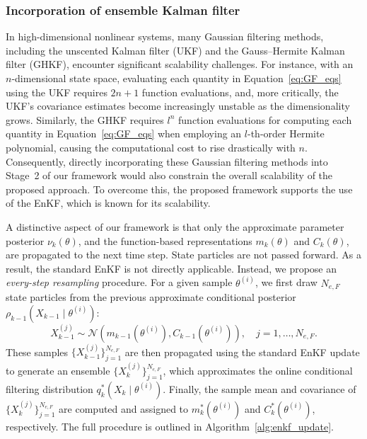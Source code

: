 \documentclass[preprint,3p,times]{elsarticle}
\begin{document}
\subsubsection{Incorporation of ensemble Kalman filter}
In high-dimensional nonlinear systems, many Gaussian filtering methods, including the unscented Kalman filter (UKF) and the Gauss–Hermite Kalman filter (GHKF), encounter significant scalability challenges. For instance, with an $n$-dimensional state space, evaluating each quantity in Equation~\eqref{eq:GF_eqs} using the UKF requires $2n+1$ function evaluations, and, more critically, the UKF’s covariance estimates become increasingly unstable as the dimensionality grows. Similarly, the GHKF requires $l^n$ function evaluations for computing each quantity in Equation~\eqref{eq:GF_eqs} when employing an $l$-th-order Hermite polynomial, causing the computational cost to rise drastically with $n$. Consequently, directly incorporating these Gaussian filtering methods into Stage~2 of our framework would also constrain the overall scalability of the proposed approach. To overcome this, the proposed framework supports the use of the EnKF, which is known for its scalability. 

A distinctive aspect of our framework is that only the approximate parameter posterior \( \nu_k(\theta) \), and the function-based representations \( m_k(\theta) \) and \( C_k(\theta) \), are propagated to the next time step. State particles are not passed forward. As a result, the standard EnKF is not directly applicable. Instead, we propose an \textit{every-step resampling} procedure. For a given sample \( \theta^{(i)} \), we first draw \( N_{e,F} \) state particles from the previous approximate conditional posterior \( \rho_{k-1}(X_{k-1} \mid \theta^{(i)}) \):
\begin{equation*}
X_{k-1}^{(j)} \sim \mathcal{N}\left(m_{k-1}(\theta^{(i)}), C_{k-1}(\theta^{(i)})\right), \quad j = 1,\dots,N_{e,F}.
\end{equation*}
These samples \( \{X_{k-1}^{(j)}\}_{j=1}^{N_{e,F}} \) are then propagated using the standard EnKF update to generate an ensemble \( \{X_k^{(j)}\}_{j=1}^{N_{e,F}} \), which approximates the online conditional filtering distribution \( q_k^*(X_k \mid \theta^{(i)}) \). Finally, the sample mean and covariance of \( \{X_k^{(j)}\}_{j=1}^{N_{e,F}} \) are computed and assigned to \( m_k^*(\theta^{(i)}) \) and \( C_k^*(\theta^{(i)}) \), respectively. The full procedure is outlined in Algorithm~\ref{alg:enkf_update}.
\end{document}
